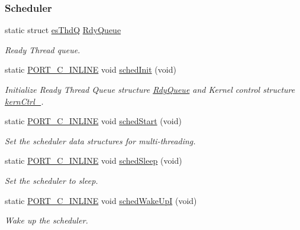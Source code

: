 \subsubsection*{Scheduler}
\begin{DoxyCompactItemize}
\item 
static struct \hyperlink{structesThdQ}{es\-Thd\-Q} \hyperlink{group__kern__impl_gafa3f26429f0f60e0d50eb119de1c8f49}{Rdy\-Queue}
\begin{DoxyCompactList}\small\item\em Ready Thread queue. \end{DoxyCompactList}\item 
static \hyperlink{group__template__compiler_ga87952d6e574c7f437503926e833ba345}{P\-O\-R\-T\-\_\-\-C\-\_\-\-I\-N\-L\-I\-N\-E} void \hyperlink{group__kern__impl_ga3a8d1dd61629856ac10022cd044591a3}{sched\-Init} (void)
\begin{DoxyCompactList}\small\item\em Initialize Ready Thread Queue structure \hyperlink{group__kern__impl_gafa3f26429f0f60e0d50eb119de1c8f49}{Rdy\-Queue} and Kernel control structure \hyperlink{structkernCtrl__}{kern\-Ctrl\-\_\-}. \end{DoxyCompactList}\item 
static \hyperlink{group__template__compiler_ga87952d6e574c7f437503926e833ba345}{P\-O\-R\-T\-\_\-\-C\-\_\-\-I\-N\-L\-I\-N\-E} void \hyperlink{group__kern__impl_gaa2fd7336d999c956fa8b74a2405cffc7}{sched\-Start} (void)
\begin{DoxyCompactList}\small\item\em Set the scheduler data structures for multi-\/threading. \end{DoxyCompactList}\item 
static \hyperlink{group__template__compiler_ga87952d6e574c7f437503926e833ba345}{P\-O\-R\-T\-\_\-\-C\-\_\-\-I\-N\-L\-I\-N\-E} void \hyperlink{group__kern__impl_gaaab2c30affeef2604f69bea4d19f32e4}{sched\-Sleep} (void)
\begin{DoxyCompactList}\small\item\em Set the scheduler to sleep. \end{DoxyCompactList}\item 
static \hyperlink{group__template__compiler_ga87952d6e574c7f437503926e833ba345}{P\-O\-R\-T\-\_\-\-C\-\_\-\-I\-N\-L\-I\-N\-E} void \hyperlink{group__kern__impl_ga0ac09697c7f2168695a853598caac057}{sched\-Wake\-Up\-I} (void)
\begin{DoxyCompactList}\small\item\em Wake up the scheduler. \end{DoxyCompactList}\item 

\end{DoxyCompactItemize}

